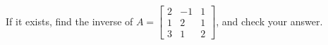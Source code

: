 If it exists, find the inverse of 
$A = \begin{bmatrix}  2 & -1 & 1\\ 1 & 2 & 1\\3 & 1 & 2\end{bmatrix}$, 
and check your answer.
